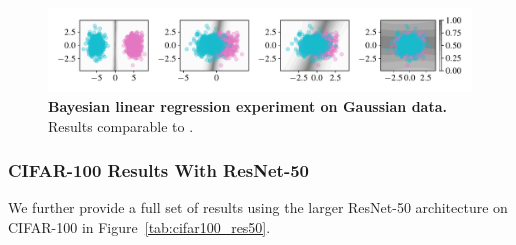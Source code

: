 \begin{figure}[t]
  \centering
  \includegraphics[width=\linewidth]{figs/sptd/blr.pdf}
\caption[Bayesian linear regression experiment on Gaussian data.]{\textbf{Bayesian linear regression experiment on Gaussian data.} Results comparable to \de.}
\label{fig:blr}
\end{figure}

\subsubsection{CIFAR-100 Results With ResNet-50}

We further provide a full set of results using the larger ResNet-50 architecture on CIFAR-100 in Figure~\ref{tab:cifar100_res50}.


